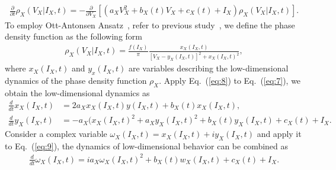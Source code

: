 \documentclass[10pt,letterpaper]{article}
\begin{document}
\begin{eqnarray}
\label{eq:7}
    \frac{\partial}{\partial t}\rho_{X}(V_{X}|I_{X},t)=-\frac{\partial}{\partial V_{X}}\left[ \left( a_{X}V_{X}^{2} + b_{X}(t)V_{X} + c_{X}(t) + I_{X}\right) \rho_{X}(V_{X}|I_{X},t) \right].
\end{eqnarray}
To employ Ott-Antonsen Ansatz~\cite{ott2008}, refer to previous study~\cite{montbrio2015}, we define the phase density function as the following form
\begin{eqnarray}
\label{eq:8}
    \rho_{X}(V_{X}|I_{X},t) = \frac{f(I_{X})}{\pi}\frac{x_{X}(I_{X},t)}{\left[ V_{X}-y_{X}(I_{X},t)\right]^{2} + x_{X}(I_{X},t)^{2}},
\end{eqnarray}
where $x_{X}(I_{X},t)$ and $y_{x}(I_{X},t)$ are variables describing the low-dimensional dynamics of the phase density function $\rho_{X}$. Apply Eq.~(\ref{eq:8}) to Eq.~(\ref{eq:7}), we obtain the low-dimensional dynamics as
\begin{subequations}
\label{eq:9}
\begin{align}
    \frac{d}{dt}x_{X}(I_{X},t) &= 2a_{X}x_{X}(I_{X},t)y(I_{X},t) + b_{X}(t)x_{X}(I_{X},t), \label{eq:9a} \\
    \frac{d}{dt}y_{X}(I_{X},t) &= -a_{X}(x_{X}(I_{X},t)^{2} + a_{X}y_{X}(I_{X},t)^{2} + b_{X}(t)y_{X}(I_{X},t) + c_{X}(t) + I_{X}. \label{eq:9b}
\end{align}
\end{subequations}
Consider a complex variable $\omega_{X}(I_{X},t)=x_{X}(I_{X},t)+iy_{X}(I_{X},t)$ and apply it to Eq.~(\ref{eq:9}), the dynamics of low-dimensional behavior can be combined as
\begin{eqnarray}
\label{eq:10}
    \frac{d}{dt}\omega_{X}(I_{X},t) = ia_{X}\omega_{X}(I_{X},t)^{2} + b_{X}(t)w_{X}(I_{X},t) + c_{X}(t) + I_{X}.
\end{eqnarray}
\end{document}
